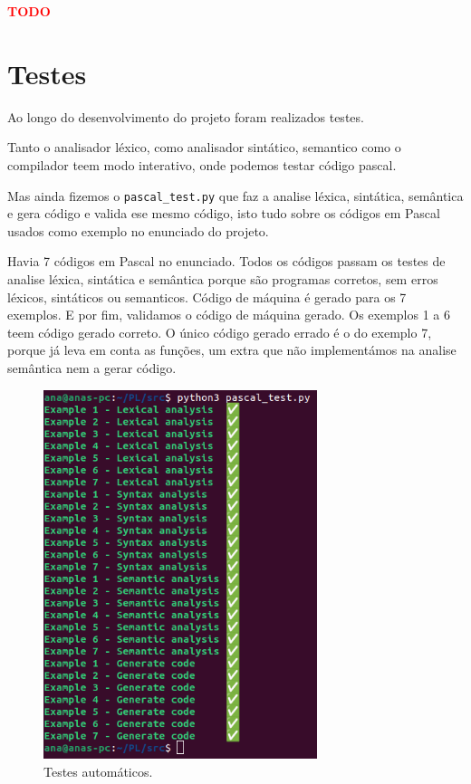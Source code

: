 \documentclass[12pt,a4paper]{report}
\begin{document}
\textcolor{red}{\textbf{TODO}}

\chapter{Testes}

Ao longo do desenvolvimento do projeto foram realizados testes.

Tanto o analisador léxico, como analisador sintático, semantico como o compilador teem modo interativo, onde podemos testar código pascal.

Mas ainda fizemos o \texttt{pascal\_test.py} que faz a analise léxica, sintática, semântica e gera código e valida ese mesmo código, isto tudo sobre os códigos em Pascal usados como exemplo no
enunciado do projeto.

Havia 7 códigos em Pascal no enunciado. Todos os códigos passam os testes de analise léxica, sintática e semântica porque são programas corretos, sem erros léxicos, sintáticos ou semanticos.
Código de máquina é gerado para os 7 exemplos. E por fim, validamos o código de máquina gerado. Os exemplos 1 a 6 teem código gerado correto. O único código gerado errado é o do exemplo 7, porque já leva
em conta as funções, um extra que não implementámos na analise semântica nem a gerar código.

\begin{figure}[H]
    \centering
    \includegraphics[width=8cm]{images/tests.png}
    \caption{Testes automáticos.}    
\end{figure}
\end{document}
